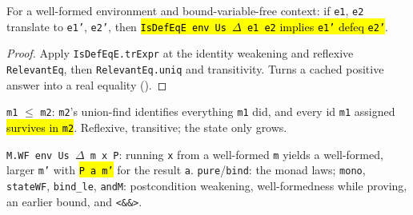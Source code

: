 \begin{theorem}
\label{thm:eqvmgr-isdefeqe-uniq}
\leanok
{}
 For a well-formed environment and bound-variable-free context: if \texttt{e1},
\texttt{e2} translate to \texttt{e1'}, \texttt{e2'}, then \hl{\texttt{IsDefEqE env Us $\Delta$ e1
e2} implies \texttt{e1'} defeq \texttt{e2'}}.
\end{theorem}
\begin{proof}
\leanok
{} Apply \texttt{IsDefEqE.trExpr} at the identity weakening and reflexive
\texttt{RelevantEq}, then \texttt{RelevantEq.uniq} and transitivity. Turns a cached positive answer
into a real equality ().
\end{proof}

\begin{definition}
\label{def:eqvmgr-le}
\leanok
{}
 \texttt{m1} $\le$ \texttt{m2}: \texttt{m2}'s union-find identifies everything
\texttt{m1} did, and every id \texttt{m1} assigned \hl{survives in \texttt{m2}}. Reflexive, transitive;
the state only grows.
\end{definition}

\begin{definition}
\label{def:eqvmgr-mwf}
\leanok
{}
 \texttt{M.WF env Us $\Delta$ m x P}: running \texttt{x} from a well-formed \texttt{m}
yields a well-formed, larger \texttt{m'} with \hl{\texttt{P a m'}} for the result \texttt{a}.
\texttt{pure}/\texttt{bind}: the monad laws; \texttt{mono}, \texttt{stateWF}, \texttt{bind\_le},
\texttt{andM}: postcondition weakening, well-formedness while proving, an earlier bound, and
\texttt{<\&\&>}.
\end{definition}


